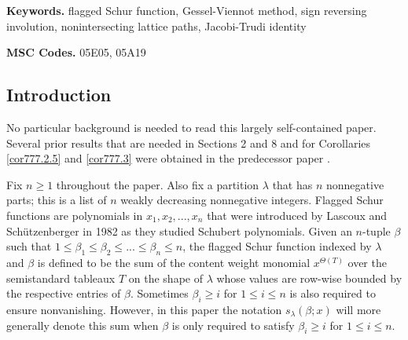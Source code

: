 \documentclass[11pt]{article}
\theoremstyle{definition}
\theoremstyle{remark}
\numberwithin{equation}{section}
\begin{document}
\endgroup

\vspace{.5pc}\noindent\textbf{Keywords.}  flagged Schur function, Gessel-Viennot method, sign reversing involution, nonintersecting lattice paths, Jacobi-Trudi identity

\vspace{1pc}\noindent\textbf{MSC Codes.}  05E05, 05A19


\begin{spacing}{1.35}



\section{Introduction}

No particular background is needed to read this largely self-contained paper. Several prior results that are needed in Sections 2 and 8 and for Corollaries \ref{cor777.2.5} and \ref{cor777.3} were obtained in the predecessor paper \cite{PW}.



Fix $n \geq 1$ throughout the paper.  Also fix a partition $\lambda$ that has $n$ nonnegative parts; this is a list of $n$ weakly decreasing nonnegative integers.  Flagged Schur functions are polynomials in $x_1, x_2, ... , x_n$ that were introduced by Lascoux and Sch{\"u}tzenberger in 1982 as they studied Schubert polynomials.  Given an $n$-tuple $\beta$ such that $1 \leq \beta_1 \leq \beta_2 \leq ... \leq \beta_n \leq n$, the flagged Schur function indexed by $\lambda$ and $\beta$ is defined to be the sum of the content weight monomial $x^{\Theta(T)}$ over the semistandard tableaux $T$ on the shape of $\lambda$ whose values are row-wise bounded by the respective entries of $\beta$.  Sometimes $\beta_i \geq i$ for $1 \leq i \leq n$ is also required to ensure nonvanishing.  However, in this paper the notation $s_\lambda(\beta;x)$ will more generally denote this sum when $\beta$ is only required to satisfy $\beta_i \geq i$ for $1 \leq i \leq n$.




\end{spacing}
\end{document}
